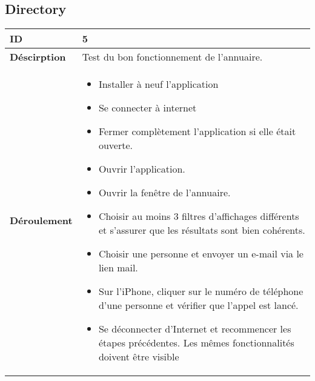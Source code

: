 		\subsection{Directory}
					 \begin{longtable}{m{4cm}|p{10cm}|}
					 \textbf{ ID} & 5 \\
					 \hline \textbf{Déscirption} & Test du bon fonctionnement de l'annuaire.\\
					 \hline \textbf{Déroulement} &
						 \begin{itemize}
						  	\item Installer à neuf l'application
						  	\item Se connecter à internet
							 \item Fermer complètement l'application si elle était ouverte.
							 \item Ouvrir l'application.
							 \item Ouvrir la fenêtre de l'annuaire.
							 \item Choisir au moins 3 filtres d'affichages différents et s'assurer que les résultats sont bien cohérents. 
							 \item Choisir une personne et envoyer un e-mail via le lien mail.
							 \item Sur l'iPhone, cliquer sur le numéro de téléphone d'une personne et vérifier que l'appel est lancé.
							\item Se déconnecter d'Internet et recommencer les étapes précédentes. Les mêmes fonctionnalités doivent être visible
						 \end{itemize}
					 \\
				 \end{longtable} 
				 
